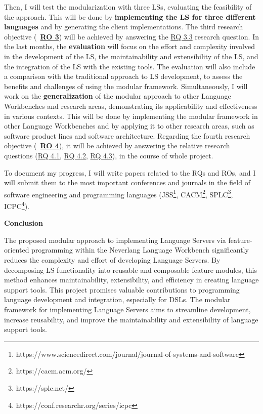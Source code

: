 Then, I will test the modularization with three LSs, evaluating the feasibility of the approach. This will be done by \textbf{implementing the LS for three different languages} and by generating the client implementations. The third research objective (~\hyperlink{ro3}{\textbf{RO 3}}) will be achieved by answering the \hyperlink{rq33}{\textsf{RQ 3.3}} research question.
In the last months, the \textbf{evaluation} will focus on the effort and complexity involved in the development of the LS, the maintainability and extensibility of the LS, and the integration of the LS with the existing tools. The evaluation will also include a comparison with the traditional approach to LS development, to assess the benefits and challenges of using the modular framework.
Simultaneously, I will work on the \textbf{generalization} of the modular approach to other Language Workbenches and research areas, demonstrating its applicability and effectiveness in various contexts. This will be done by implementing the modular framework in other Language Workbenches and by applying it to other research areas, such as software product lines and software architecture.
Regarding the fourth research objective (~\hyperlink{ro4}{\textbf{RO 4}}), it will be achieved by answering the relative research questions (\hyperlink{rq41}{\textsf{RQ 4.1}}, \hyperlink{rq42}{\textsf{RQ 4.2}}, \hyperlink{rq43}{\textsf{RQ 4.3}}), in the course of whole project.

To document my progress, I will write papers related to the \textsf{RQ}s and \textsf{RO}s, and I will submit them to the most important conferences and journals in the field of software engineering and programming languages (JSS\footnote{https://www.sciencedirect.com/journal/journal-of-systems-and-software}, CACM\footnote{https://cacm.acm.org/}, SPLC\footnote{https://splc.net/}, ICPC\footnote{https://conf.researchr.org/series/icpc}).

\hfill \break
\noindent
\textbf{Conclusion}

The proposed modular approach to implementing Language Servers via feature-oriented programming within the Neverlang Language Workbench significantly reduces the complexity and effort of developing Language Servers. By decomposing LS functionality into reusable and composable feature modules, this method enhances maintainability, extensibility, and efficiency in creating language support tools. This project promises valuable contributions to programming language development and integration, especially for DSLs. The modular framework for implementing Language Servers aims to streamline development, increase reusability, and improve the maintainability and extensibility of language support tools.
